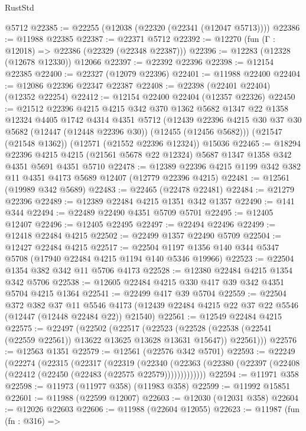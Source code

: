 \begin{lexlean}{RustStd}
\begin{coremodule}
    @5712
@22385 := @22255 (@12038 (@22320 (@22341 (@12047 @5713))))
@22386 := @11988 @22385
@22387 := @22371 @5712
@22392 := @12270 (fun (Γ : @12018) => @22386 (@22329 (@22348 @22387)))
@22396 := @12283 (@12328 (@12678 @12330)) @12066
@22397 := @22392 @22396
@22398 := @12154 @22385
@22400 := @22327 (@12079 @22396)
@22401 := @11988 @22400
@22404 := @12086 @22396 @22347 @22387
@22408 := @22398 (@22401 @22404) (@12352 @22254)
@22412 := @12154 @22400 @22404 (@12357 @22326)
@22450 := @21512
    @22396
    @4215
    @4215
    @342
    @370
    @1362
    @5682
    @1347
    @22
    @1358
    @12324
    @4405
    @1742
    @4314
    @4351
    @5712
    (@12439 @22396 @4215 @30 @37 @30 @5682 (@12447 (@12448 @22396 @30)) (@12455 (@12456 @5682)))
    (@21547 (@21548 @1362))
    (@12571 (@21552 @22396 @12324))
    @15036
@22465 := @18294
    @22396
    @4215
    @4215
    (@21561 @5678 @22 @12324)
    @5687
    @1347
    @1358
    @342
    @4351
    @5691
    @4351
    @5710
@22478 := @12389 @22396 @4215 @1199 @342 @382 @11 @4351 @4173 @5689 @12407 (@12779 @22396 @4215)
@22481 := @12561 (@19989 @342 @5689)
@22483 := @22465 (@22478 @22481)
@22484 := @21279 @22396
@22489 := @12389 @22484 @4215 @1351 @342 @1357
@22490 := @141 @344
@22494 := @22489 @22490 @4351 @5709 @5701
@22495 := @12405 @12407
@22496 := @12405 @22495
@22497 := @22494 @22496
@22499 := @12418 @22484 @4215
@22502 := @22499 @1357 @22490 @5709
@22504 := @12427 @22484 @4215
@22517 := @22504 @1197 @1356 @140 @344 @5347 @5708 (@17940 @22484 @4215 @1194 @140 @5346 @19966)
@22523 := @22504 @1354 @382 @342 @11 @5706 @4173
@22528 := @12380 @22484 @4215 @1354 @342 @5706
@22538 := @12605 @22484 @4215 @330 @417 @39 @342 @4351 @5704 @4215 @1364
@22541 := @22499 @417 @39 @5704
@22559 := @22504
    @372
    @382
    @37
    @11
    @5546
    @4173
    (@12439 @22484 @4215 @22 @37 @22 @5546 (@12447 (@12448 @22484 @22)) @21540)
@22561 := @12549 @22484 @4215
@22575 := @22497
    (@22502
      (@22517
        (@22523
          (@22528 (@22538 (@22541 (@22559 @22561)) @13622 @13625 @13628 @13631 @15647))
          @22561)))
@22576 := @12563 @1351
@22579 := @12561 (@22576 @342 @5701)
@22593 := @22249
    (@22274
      (@22315
        (@22317
          (@22319
            (@22340
              (@22363 (@22380 (@22397 (@22408 (@22412 (@22450 (@22483 (@22575 @22579)))))))))))))
@22594 := @11971 @358
@22598 := @11973 (@11977 @358) (@11983 @358)
@22599 := @11992 @15851
@22601 := @11988 (@22599 @12007)
@22603 := @12030 (@12031 @358)
@22604 := @12026 @22603
@22606 := @11988 (@22604 @12055)
@22623 := @11987
    (fun (fn : @316) =>

\end{coremodule}
\end{lexlean}
